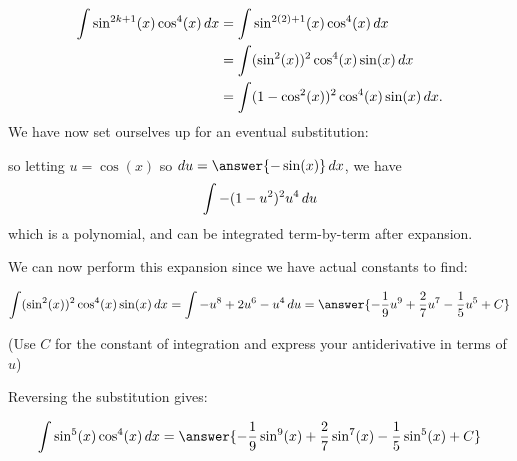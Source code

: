 \documentclass{ximera}
\begin{document}
\begin{exercise}
\begin{exercise}
\begin{align*}
  \int \sin^{2k+1}(x) \cos^4(x) \mathop{}\!d x &=  \int \sin^{2(2)+1}(x) \cos^4(x) \mathop{}\!d x \\
  &= \int(\sin^{2}(x))^2 \cos^4(x) \sin(x) \mathop{}\!d x\\
  &= \int (1-\cos^2(x))^2 \cos^4(x) \sin(x)\mathop{}\!d x.
\end{align*}
We have now set ourselves up for an eventual substitution:
\begin{center}%
\end{center}
so letting $u = \cos(x)$ so $\d u =\answer{-\sin(x)} \d x$, we have
\[
\int -(1-u^2)^2 u^4 \mathop{}\!d u
\]
which is a polynomial, and can be integrated term-by-term after expansion.  

\begin{exercise}
We can now perform this expansion since we have actual constants to find:

\[  \int(\sin^{2}(x))^2 \cos^4(x) \sin(x) \d x = \int -u^8+2u^6-u^4 \d u =\answer{-\frac{1}{9}u^9+\frac{2}{7}u^7-\frac{1}{5}u^5 +C}\]

(Use $C$ for the constant of integration and express your antiderivative in terms of $u$)
\begin{exercise}

Reversing the substitution gives:

\[
\int \sin^5(x) \cos^4(x) \d x=\answer{-\frac{1}{9}\sin^9(x)+\frac{2}{7}\sin^7(x)-\frac{1}{5}\sin^5(x) +C}
\]
\end{exercise}


\end{exercise}
\end{exercise}
\end{exercise}
\end{document}
